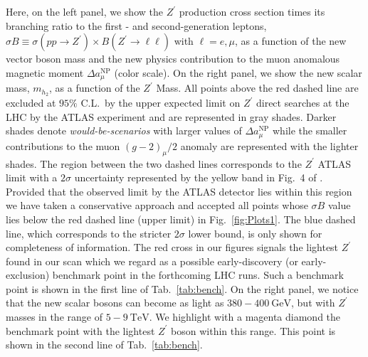 Here, on the left panel, we show the $Z^\prime$ production cross section times its branching ratio to the first - and second-generation leptons, $\sigma B \equiv \sigma \left( pp \to Z^\prime \right) \times B \left( Z^\prime \to \ell \ell \right) $ with $\ell = e,\mu$, as a function of the new vector boson mass and the new physics contribution to the muon anomalous magnetic moment $\Delta a^{\textrm{NP}}_\mu$ (color scale). 
%
On the right panel, we show the new scalar mass, $m_{h_2}$, as a function of the $Z^\prime$ Mass. 
%
All points above the red dashed line are excluded at $95\%$ C.L.~by the upper expected limit on $Z^\prime$ direct searches at the LHC by the ATLAS experiment and are represented in gray shades. 
%
Darker shades denote \textit{would-be-scenarios} with larger values of $\Delta a^{\textrm{NP}}_\mu$ while the smaller contributions to the muon $\left(g-2\right)_\mu / 2$ anomaly are represented with the lighter shades. 
%
The region between the two dashed lines corresponds to the $Z^\prime$ ATLAS limit with a $2\sigma$ uncertainty represented by the yellow band in Fig.~4 of \cite{Aaboud:2017buh}.
%
Provided that the observed limit by the ATLAS detector lies within this region we have taken a conservative approach and accepted all points whose $\sigma B$ value lies below the red dashed line (upper limit) in Fig.~\ref{fig:Plots1}.
%
The blue dashed line, which corresponds to the stricter $2 \sigma$ lower bound, is only shown for completeness of information. The red cross in our figures signals the lightest $Z^\prime$ found in our scan which we regard as a possible early-discovery (or early-exclusion) benchmark point in the forthcoming LHC runs. Such a benchmark point is shown in the first line of Tab.~\ref{tab:bench}.
%
On the right panel, we notice that the new scalar bosons can become as light as $380 - 400~\textrm{GeV}$, but with $Z^\prime$ masses in the range of $5 - 9~\textrm{TeV}$. We highlight with a magenta diamond the benchmark point with the lightest $Z^\prime$ boson within this range. 
%
This point is shown in the second line of Tab.~\ref{tab:bench}.
%
